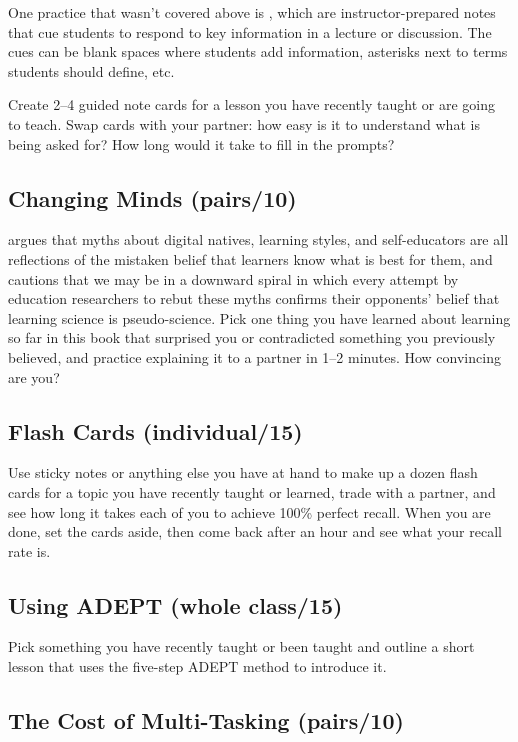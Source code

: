 One practice that wasn't covered above is , which are instructor-prepared notes that cue
students to respond to key information in a lecture or discussion. The
cues can be blank spaces where students add information, asterisks
next to terms students should define, etc.

Create 2--4 guided note cards for a lesson you have recently taught or
are going to teach. Swap cards with your partner: how easy is it to
understand what is being asked for? How long would it take to fill in
the prompts?

\subsection*{Changing Minds (pairs/10)}

\cite{Kirs2013} argues that myths about digital natives, learning
styles, and self-educators are all reflections of the mistaken belief
that learners know what is best for them, and cautions that we may be in
a downward spiral in which every attempt by education researchers to
rebut these myths confirms their opponents' belief that learning science
is pseudo-science. Pick one thing you have learned about learning so far
in this book that surprised you or contradicted something you previously
believed, and practice explaining it to a partner in 1--2 minutes. How
convincing are you?

\subsection*{Flash Cards (individual/15)}

Use sticky notes or anything else you have at hand to make up a dozen
flash cards for a topic you have recently taught or learned, trade with
a partner, and see how long it takes each of you to achieve 100\% perfect
recall. When you are done, set the cards aside, then come back after an
hour and see what your recall rate is.

\subsection*{Using ADEPT (whole class/15)}

Pick something you have recently taught or been taught and outline a
short lesson that uses the five-step ADEPT method to introduce it.

\subsection*{The Cost of Multi-Tasking (pairs/10)}


